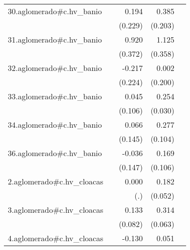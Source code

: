 {\begin{longtable}{l*{4}{D{.}{.}{-1}}}
\addlinespace
30.aglomerado#c.hv\_banio&                     &       0.194         &       0.385         &                     \\
            &                     &     (0.229)         &     (0.203)         &                     \\
\addlinespace
31.aglomerado#c.hv\_banio&                     &       0.920\sym{*}  &       1.125\sym{**} &                     \\
            &                     &     (0.372)         &     (0.358)         &                     \\
\addlinespace
32.aglomerado#c.hv\_banio&                     &      -0.217         &       0.002         &                     \\
            &                     &     (0.224)         &     (0.200)         &                     \\
\addlinespace
33.aglomerado#c.hv\_banio&                     &       0.045         &       0.254\sym{***}&                     \\
            &                     &     (0.106)         &     (0.030)         &                     \\
\addlinespace
34.aglomerado#c.hv\_banio&                     &       0.066         &       0.277\sym{**} &                     \\
            &                     &     (0.145)         &     (0.104)         &                     \\
\addlinespace
36.aglomerado#c.hv\_banio&                     &      -0.036         &       0.169         &                     \\
            &                     &     (0.147)         &     (0.106)         &                     \\
\addlinespace
2.aglomerado#c.hv\_cloacas&                     &       0.000         &       0.182\sym{***}&                     \\
            &                     &         (.)         &     (0.052)         &                     \\
\addlinespace
3.aglomerado#c.hv\_cloacas&                     &       0.133         &       0.314\sym{***}&                     \\
            &                     &     (0.082)         &     (0.063)         &                     \\
\addlinespace
4.aglomerado#c.hv\_cloacas&                     &      -0.130\sym{*}  &       0.051         &                     \\

\end{longtable}}
